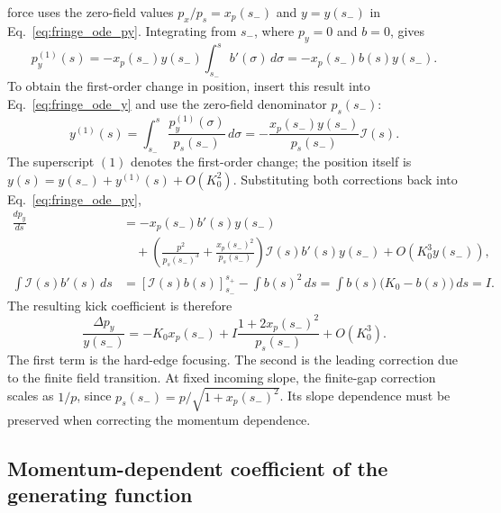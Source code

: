 force uses the zero-field values $p_x/p_s=x_p(s_-)$ and $y=y(s_-)$ in
Eq.~\eqref{eq:fringe_ode_py}. Integrating from $s_-$, where $p_y=0$ and
$b=0$, gives
\begin{equation}
 p_y^{(1)}(s)
 =-x_p(s_-)y(s_-)\int_{s_-}^{s}b'(\sigma)\,d\sigma
 =-x_p(s_-)b(s)y(s_-).
\end{equation}
To obtain the first-order change in position, insert this result into
Eq.~\eqref{eq:fringe_ode_y} and use the zero-field denominator $p_s(s_-)$:
\begin{equation}
 y^{(1)}(s)=\int_{s_-}^{s}\frac{p_y^{(1)}(\sigma)}{p_s(s_-)}\,d\sigma
 =-\frac{x_p(s_-)y(s_-)}{p_s(s_-)}\mathcal{I}(s).
\end{equation}
The superscript $(1)$ denotes the first-order change; the position itself
is $y(s)=y(s_-)+y^{(1)}(s)+O(K_0^2)$.
Substituting both corrections back into Eq.~\eqref{eq:fringe_ode_py},
\begin{align}
 \frac{dp_y}{ds}
 &=-x_p(s_-) b'(s)y(s_-)\nonumber\\
 &\quad+\left(\frac{p^2}{p_s(s_-)^3}+\frac{x_p(s_-)^2}{p_s(s_-)}\right)\mathcal{I}(s)b'(s)y(s_-)
   +O(K_0^3 y(s_-)),\\
 \int \mathcal{I}(s)b'(s)\,ds
 &=[\mathcal{I}(s)b(s)]_{s_-}^{s_+}-\int b(s)^2\,ds
   =\int b(s)\bigl(K_0-b(s)\bigr)\,ds=I.
\end{align}
The resulting kick coefficient is therefore
\begin{equation}
 \frac{\Delta p_y}{y(s_-)}
 =-K_0x_p(s_-)+I\frac{1+2x_p(s_-)^2}{p_s(s_-)}+O(K_0^3).
\label{eq:fringe_midplane_kick}
\end{equation}
The first term is the hard-edge focusing. The second is the leading correction
due to the finite field transition. At fixed incoming slope, the finite-gap correction scales as $1/p$,
since $p_s(s_-)=p/\sqrt{1+x_p(s_-)^2}$. Its slope dependence must be
preserved when correcting the momentum dependence.

\subsection{Momentum-dependent coefficient of the generating function}

